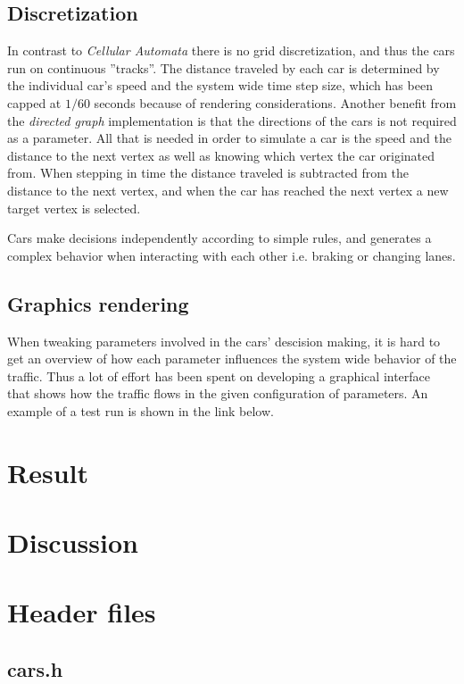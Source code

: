 \documentclass{article}
\begin{document}
  \subsection{Discretization}
    In contrast to \textit{Cellular Automata}
    there is no grid discretization, and thus the cars run on continuous ''tracks''.
    The distance traveled by each car is determined by the individual car's speed and
    the system wide time step size,
    which has been capped at $1/60$ seconds because of rendering considerations.
    Another benefit from the \textit{directed graph} implementation is that
    the directions of the cars is not required as a parameter. All that is needed in
    order to simulate a car is the speed and the distance
    to the next vertex as well as knowing which vertex the car originated from.
    When stepping in time the distance traveled is subtracted from the distance to the next vertex, and
    when the car has reached the next vertex a new target vertex is selected.

    Cars make decisions independently according to simple rules, and generates
    a complex behavior when interacting with each other i.e. braking or changing lanes.

  \subsection{Graphics rendering}
    When tweaking parameters involved in the cars' descision making, it is hard to
    get an overview of how each parameter influences the system wide behavior of the
    traffic. Thus a lot of effort has been spent on developing a graphical interface
    that shows how the traffic flows in the given configuration of parameters.
    An example of a test run is shown in the link below.
\section{Result}

\section{Discussion}

\printbibliography
\pagebreak
\appendix

\section{Header files}
  \subsection{cars.h}
    
\end{document}
